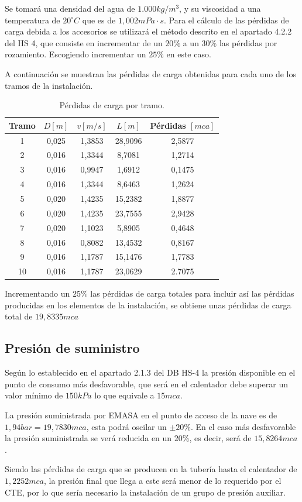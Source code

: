 \documentclass[../main.tex]{subfiles}
\begin{document}
\vspace{0.5 cm}
Se tomará una densidad del agua de $1.000 kg/m^3$, y su viscosidad a una temperatura de $20^{\circ}C$ que es de $1,002 mPa\cdot s$. Para el cálculo de las pérdidas de carga debida a los accesorios se utilizará el método descrito en el apartado 4.2.2 del HS 4, que consiste en incrementar de un $20\%$ a un $30\%$ las pérdidas por rozamiento. Escogiendo incrementar un $25\%$ en este caso. \par
\vspace{0.5 cm}
A continuación se muestran las pérdidas de carga obtenidas para cada uno de los tramos de la instalación.
\begin{table}[H]
    \centering
    \begin{tabular}{c | c | c | c | c}
         Tramo & $D[m]$ & $v[m/s]$ & $L[m]$ & Pérdidas $[mca]$ \\ \hline
         1 & 0,025 & 1,3853 & 28,9096 & 2,5877 \\ 
         2 & 0,016 & 1,3344 & 8,7081 & 1,2714 \\ 
         3 & 0,016 & 0,9947 & 1,6912 & 0,1475 \\ 
         4 & 0,016 & 1,3344 & 8,6463 & 1,2624 \\ 
         5 & 0,020 & 1,4235 & 15,2382 & 1,8877 \\ 
         6 & 0,020 & 1,4235 & 23,7555 & 2,9428 \\ 
         7 & 0,020 & 1,1023 & 5,8905 & 0,4648 \\ 
         8 & 0,016 & 0,8082 & 13,4532 & 0,8167 \\ 
         9 & 0,016 & 1,1787 & 15,1476 & 1,7783 \\ 
         10 & 0,016 & 1,1787 & 23,0629 & 2.7075 \\ 
    \end{tabular}
    \caption{Pérdidas de carga por tramo.}
\end{table}

Incrementando un $25\%$ las pérdidas de carga totales para incluir así las pérdidas producidas en los elementos de la instalación, se obtiene unas pérdidas de carga total de $19,8335mca$

\subsection{Presión de suministro}
Según lo establecido en el apartado 2.1.3 del DB HS-4 la presión disponible en el punto de consumo más desfavorable, que será en el calentador debe superar un valor mínimo de $150 kPa$ lo que equivale a $15 mca$. \par
\vspace{0.5 cm}
La presión suministrada por EMASA en el punto de acceso de la nave es de $1,94 bar = 19,7830 mca$, esta podrá oscilar un $\pm 20 \%$. En el caso más desfavorable la presión suministrada se verá reducida en un $20\%$, es decir, será de $15,8264 mca$.\par
\vspace{0.5 cm}
Siendo las pérdidas de carga que se producen en la tubería hasta el calentador de $1,2252 mca$, la presión final que llega a este será menor de lo requerido por el CTE, por lo que sería necesario la instalación de un grupo de presión auxiliar.
\end{document}
